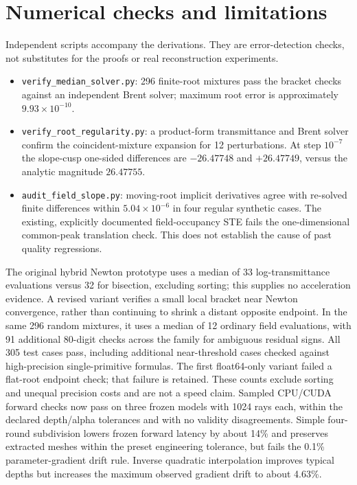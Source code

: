 \documentclass[11pt,a4paper]{article}
\begin{document}
\section{Numerical checks and limitations}
Independent scripts accompany the derivations. They are error-detection
checks, not substitutes for the proofs or real reconstruction experiments.
\begin{itemize}
\item \texttt{verify\_median\_solver.py}: 296 finite-root mixtures pass the
bracket checks against an independent Brent solver; maximum root error is
approximately $9.93\times10^{-10}$.
\item \texttt{verify\_root\_regularity.py}: a product-form transmittance and
Brent solver confirm the coincident-mixture expansion for 12 perturbations.
At step $10^{-7}$ the slope-cusp one-sided differences are
$-26.47748$ and $+26.47749$, versus the analytic magnitude $26.47755$.
\item \texttt{audit\_field\_slope.py}: moving-root implicit derivatives agree
with re-solved finite differences within $5.04\times10^{-6}$ in four
regular synthetic cases. The existing, explicitly documented field-occupancy
STE fails the one-dimensional common-peak translation check. This does not
establish the cause of past quality regressions.
\end{itemize}
The original hybrid Newton prototype uses a median of 33 log-transmittance evaluations
versus 32 for bisection, excluding sorting; this supplies no acceleration
evidence. A revised variant verifies a small local bracket near Newton convergence,
rather than continuing to shrink a distant opposite endpoint. In the same 296
random mixtures, it uses a median of 12 ordinary field evaluations, with 91
additional 80-digit checks across the family for ambiguous residual signs.
All 305 test cases pass, including additional near-threshold cases checked
against high-precision single-primitive formulas. The first float64-only
variant failed a flat-root endpoint check; that failure is retained.
These counts exclude sorting and unequal precision costs and are not a speed claim.
Sampled CPU/CUDA forward checks now pass on three frozen models with
1024 rays each, within the declared depth/alpha tolerances and with no
validity disagreements. Simple four-round subdivision lowers frozen
forward latency by about 14\% and preserves extracted meshes within
the preset engineering tolerance, but fails the 0.1\% parameter-gradient
drift rule. Inverse quadratic interpolation improves typical depths but
increases the maximum observed gradient drift to about 4.63\%.
\end{document}
